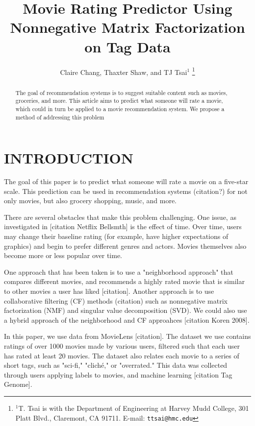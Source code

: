 \documentclass[letterpaper, 10 pt, conference]{ieeeconf}  %
\title{\LARGE \bf
Movie Rating Predictor Using Nonnegative Matrix Factorization on Tag Data
}
\author{Claire Chang, Thaxter Shaw, and TJ Tsai$^{1}$%
\thanks{$^{1}$T. Tsai is with the Department of Engineering at Harvey Mudd College,
301 Platt Blvd., Claremont, CA 91711. E-mail: {\tt\small ttsai@hmc.edu}}%
}
\begin{document}
\maketitle
\thispagestyle{empty}
\pagestyle{empty}


\begin{abstract}

The goal of recommendation systems is to suggest suitable content such as movies, groceries, and more. This article aims to predict what someone will rate a movie, which could in turn be applied to a movie recommendation system. We propose a method of addressing this problem 

\end{abstract}


\section{INTRODUCTION}

The goal of this paper is to predict what someone will rate a movie on a five-star scale.
This prediction can be used in recommendation systems (citation?) for not only movies, but also grocery shopping, music, and more.

There are several obstacles that make this problem challenging. 
One issue, as investigated in [citation Netflix Bellsmth] is the effect of time. Over time, users may change their baseline rating (for example, have higher expectations of graphics) and begin to prefer different genres and actors.
Movies themselves also become more or less popular over time.

One approach that has been taken is to use a "neighborhood approach" that compares different movies, and recommends a highly rated movie that is similar to other movies a user has liked [citation]. 
Another approach is to use collaborative filtering (CF) methods (citation) such as nonnegative matrix factorization (NMF) and singular value decomposition (SVD). 
We could also use a hybrid approach of the neighborhood and CF approahces [citation Koren 2008].

In this paper, we use data from MovieLens [citation]. The dataset we use contains ratings of over 1000 movies made by various users, filtered such that each user has rated at least 20 movies.
The dataset also relates each movie to a series of short tags, such as "sci-fi," "cliché," or "overrated." This data was collected through users applying labels to movies, and machine learning [citation Tag Genome].
\end{document}
